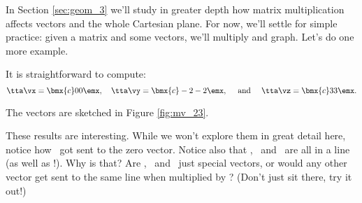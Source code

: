\medskip

In Section \ref{sec:geom_3} we'll study in greater depth how matrix multiplication affects vectors and the whole Cartesian plane. For now, we'll settle for simple practice: given a matrix and some vectors, we'll multiply and graph. Let's do one more example.

\medskip


{\begin{myfigure}%
\begin{center}
\end{center}
\label{fig:mv_23}
\end{myfigure}%

It is straightforward to compute: 
\[
\tta\vx = \bmx{c} 0\\0\emx,\quad \tta\vy = \bmx{c} -2\\-2\emx, \quad \text{ and } \quad \tta\vz = \bmx{c} 3\\3\emx.
\]

The vectors are sketched in Figure \ref{fig:mv_23}.

These results are interesting. While we won't explore them in great detail here, notice how \vx\ got sent to the zero vector. Notice also that \tta\vx, \tta\vy\ and \tta\vz\ are all in a line (as well as \vx!). Why is that? Are \vx, \vy\ and \vz\ just special vectors, or would any other vector get sent to the same line when multiplied by \tta? (Don't just sit there, try it out!)
}

